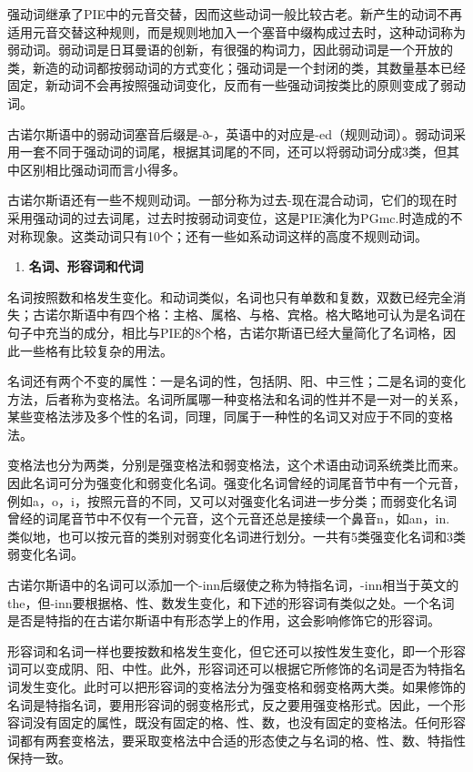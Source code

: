 强动词继承了PIE中的元音交替，因而这些动词一般比较古老。新产生的动词不再适用元音交替这种规则，而是规则地加入一个塞音中缀构成过去时，这种动词称为弱动词。弱动词是日耳曼语的创新，有很强的构词力，因此弱动词是一个开放的类，新造的动词都按弱动词的方式变化；强动词是一个封闭的类，其数量基本已经固定，新动词不会再按照强动词变化，反而有一些强动词按类比的原则变成了弱动词。

古诺尔斯语中的弱动词塞音后缀是-ð-，英语中的对应是-ed（规则动词）。弱动词采用一套不同于强动词的词尾，根据其词尾的不同，还可以将弱动词分成3类，但其中区别相比强动词而言小得多。

古诺尔斯语还有一些不规则动词。一部分称为过去-现在混合动词，它们的现在时采用强动词的过去词尾，过去时按弱动词变位，这是PIE演化为PGmc.时造成的不对称现象。这类动词只有10个；还有一些如系动词这样的高度不规则动词。

\begin{enumerate}
\def\labelenumi{\Alph{enumi}.}
\setcounter{enumi}{2}
\item
  \textbf{名词、形容词和代词}
\end{enumerate}

名词按照数和格发生变化。和动词类似，名词也只有单数和复数，双数已经完全消失；古诺尔斯语中有四个格：主格、属格、与格、宾格。格大略地可认为是名词在句子中充当的成分，相比与PIE的8个格，古诺尔斯语已经大量简化了名词格，因此一些格有比较复杂的用法。

名词还有两个不变的属性：一是名词的性，包括阴、阳、中三性；二是名词的变化方法，后者称为变格法。名词所属哪一种变格法和名词的性并不是一对一的关系，某些变格法涉及多个性的名词，同理，同属于一种性的名词又对应于不同的变格法。

变格法也分为两类，分别是强变格法和弱变格法，这个术语由动词系统类比而来。因此名词可分为强变化和弱变化名词。强变化名词曾经的词尾音节中有一个元音，例如a，o，i，按照元音的不同，又可以对强变化名词进一步分类；而弱变化名词曾经的词尾音节中不仅有一个元音，这个元音还总是接续一个鼻音n，如an，in.
类似地，也可以按元音的类别对弱变化名词进行划分。一共有5类强变化名词和3类弱变化名词。

古诺尔斯语中的名词可以添加一个-inn后缀使之称为特指名词，-inn相当于英文的the，但-inn要根据格、性、数发生变化，和下述的形容词有类似之处。一个名词是否是特指的在古诺尔斯语中有形态学上的作用，这会影响修饰它的形容词。

形容词和名词一样也要按数和格发生变化，但它还可以按性发生变化，即一个形容词可以变成阴、阳、中性。此外，形容词还可以根据它所修饰的名词是否为特指名词发生变化。此时可以把形容词的变格法分为强变格和弱变格两大类。如果修饰的名词是特指名词，要用形容词的弱变格形式，反之要用强变格形式。因此，一个形容词没有固定的属性，既没有固定的格、性、数，也没有固定的变格法。任何形容词都有两套变格法，要采取变格法中合适的形态使之与名词的格、性、数、特指性保持一致。


